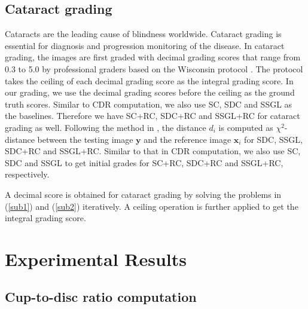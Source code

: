 \documentclass[journal]{IEEEtran}
\begin{document}
   
  
\subsection{Cataract grading}
 Cataracts are the leading cause of   blindness worldwide. Cataract grading  is essential for diagnosis and progression monitoring of the disease. In cataract grading, the images are first graded with decimal grading scores that
 range from 0.3  to 5.0 by professional graders based on
 the Wisconsin protocol \cite{Klein1990}.   The protocol takes the ceiling of each decimal grading score as the integral grading score.  
 In our grading, we use the decimal grading scores before the ceiling as the ground truth scores. 
 Similar to CDR computation, we also use SC, SDC and SSGL as the baselines.
 Therefore we have SC+RC, SDC+RC and SSGL+RC for cataract grading as well.
 Following the method in \cite{Xu13}, the distance $d_i$ is computed as $ \chi^2$-distance between the testing image $\textbf{y}$ and the reference image $\textbf{x}_i$ for SDC, SSGL, SDC+RC and SSGL+RC.
  Similar to that in CDR computation, we also use SC, SDC and SSGL to get initial grades for SC+RC, SDC+RC and SSGL+RC, respectively.
  
A decimal score is obtained for cataract grading by solving the problems in (\ref{sub1}) and (\ref{sub2}) iteratively. A ceiling operation is further applied to get the integral grading score.
  

\section{Experimental
Results} \label{Exp}
\subsection{Cup-to-disc ratio computation}
\end{document}
